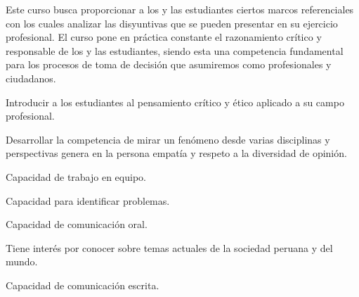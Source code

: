 \begin{syllabus}


\begin{justification}
Este curso busca proporcionar a los y las estudiantes ciertos marcos referenciales con los cuales analizar las disyuntivas que se pueden presentar en su ejercicio profesional. 
El curso pone en práctica constante el razonamiento crítico y responsable de los  y las estudiantes, siendo esta una competencia fundamental para los procesos de toma de decisión que asumiremos como profesionales y ciudadanos.
\end{justification}
\begin{goals}
\item Introducir a los estudiantes al pensamiento crítico y ético aplicado a su campo profesional.
\item Desarrollar la competencia de mirar un fenómeno desde varias disciplinas y perspectivas genera en la persona empatía y respeto a la diversidad de opinión.
\item Capacidad de trabajo en equipo.
\item Capacidad para identificar problemas.
\item Capacidad de comunicación oral.
\item Tiene interés por conocer sobre temas actuales de la sociedad peruana y del mundo.
\item Capacidad de comunicación escrita.
\end{goals}

\begin{outcomes}
    \item {}
    \item {}
    \item {}
    \item {}
    \item {}
\end{outcomes}

\begin{competences}
    \item {}
    \item {}
    \item {}
    \item {}
\end{competences}


\end{syllabus}
